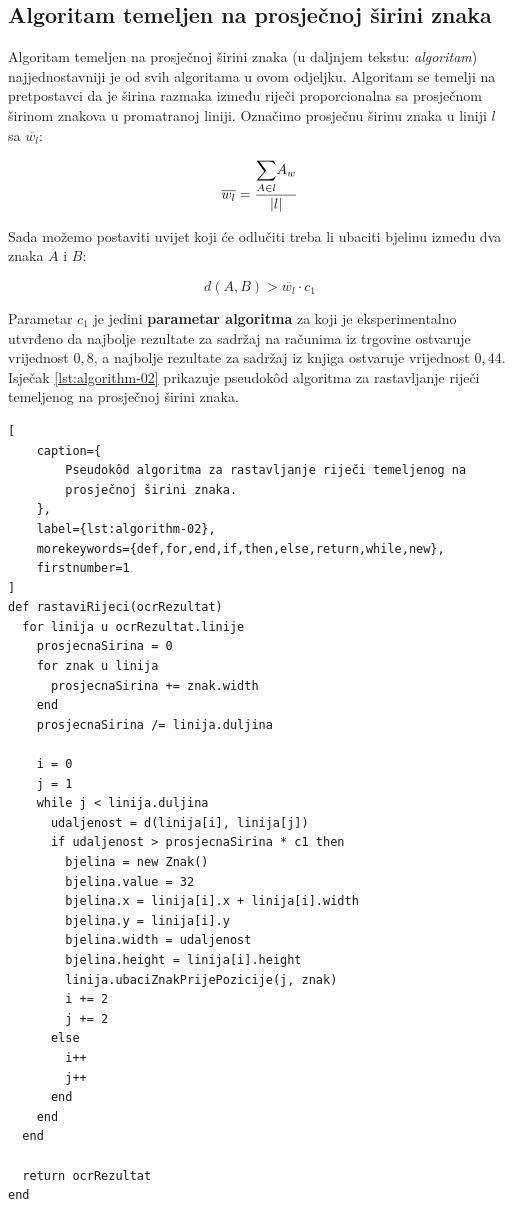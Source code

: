 \documentclass[times, utf8, zavrsni]{fer}
\begin{document}
\subsection{Algoritam temeljen na prosječnoj širini znaka}
\label{subsec:algoritam-temeljen-na-prosjecnoj-sirini znaka}
Algoritam temeljen na prosječnoj širini znaka (u daljnjem tekstu:
\emph{algoritam}) najjednostavniji je od svih algoritama u ovom odjeljku.
Algoritam se temelji na pretpostavci da je širina razmaka između
riječi proporcionalna sa prosječnom širinom znakova u promatranoj liniji.
Označimo prosječnu širinu znaka u liniji $l$ sa $\overline{w_l}$:

\begin{equation}
\overline{w_l} = \frac{\mathlarger{\sum}\limits_{A \in l} A_w}{|l|}
\end{equation}

Sada možemo postaviti uvijet koji će odlučiti treba li ubaciti bjelinu između
dva znaka $A$ i $B$:

\begin{equation}
\label{eq:condition-01}
d(A, B) > \overline{w_l} \cdot c_1
\end{equation}

Parametar $c_1$ je jedini \textbf{parametar algoritma} za koji je
eksperimentalno utvrđeno da najbolje rezultate za sadržaj na računima iz
trgovine ostvaruje vrijednost $0{,}8$, a najbolje rezultate za sadržaj iz
knjiga ostvaruje vrijednost $0{,}44$. Isječak \ref{lst:algorithm-02} prikazuje
pseudokôd algoritma za rastavljanje riječi temeljenog na prosječnoj širini
znaka.

\begin{lstlisting}[
    caption={
        Pseudokôd algoritma za rastavljanje riječi temeljenog na
        prosječnoj širini znaka.
    },
    label={lst:algorithm-02},
    morekeywords={def,for,end,if,then,else,return,while,new},
    firstnumber=1
]
def rastaviRijeci(ocrRezultat)
  for linija u ocrRezultat.linije
    prosjecnaSirina = 0
    for znak u linija
      prosjecnaSirina += znak.width
    end
    prosjecnaSirina /= linija.duljina

    i = 0
    j = 1
    while j < linija.duljina
      udaljenost = d(linija[i], linija[j])
      if udaljenost > prosjecnaSirina * c1 then
        bjelina = new Znak()
        bjelina.value = 32
        bjelina.x = linija[i].x + linija[i].width
        bjelina.y = linija[i].y
        bjelina.width = udaljenost
        bjelina.height = linija[i].height
        linija.ubaciZnakPrijePozicije(j, znak)
        i += 2
        j += 2
      else
        i++
        j++
      end
    end
  end

  return ocrRezultat
end
\end{lstlisting}
\end{document}
